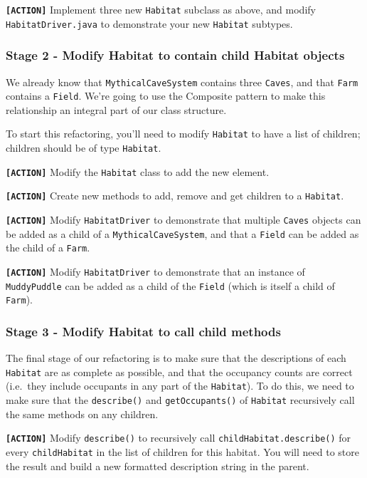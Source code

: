 \documentclass[
]{book}
\begin{document}
\textbf{\texttt{{[}ACTION{]}}} Implement three new \texttt{Habitat} subclass as above, and modify \texttt{HabitatDriver.java} to demonstrate your new \texttt{Habitat} subtypes.

\hypertarget{children}{%
\subsubsection{Stage 2 - Modify Habitat to contain child Habitat objects}\label{children}}

We already know that \texttt{MythicalCaveSystem} contains three \texttt{Caves}, and that \texttt{Farm} contains a \texttt{Field}. We're going to use the Composite pattern to make this relationship an integral part of our class structure.

To start this refactoring, you'll need to modify \texttt{Habitat} to have a list of children; children should be of type \texttt{Habitat}.

\textbf{\texttt{{[}ACTION{]}}} Modify the \texttt{Habitat} class to add the new element.

\textbf{\texttt{{[}ACTION{]}}} Create new methods to add, remove and get children to a \texttt{Habitat}.

\textbf{\texttt{{[}ACTION{]}}} Modify \texttt{HabitatDriver} to demonstrate that multiple \texttt{Caves} objects can be added as a child of a \texttt{MythicalCaveSystem}, and that a \texttt{Field} can be added as the child of a \texttt{Farm}.

\textbf{\texttt{{[}ACTION{]}}} Modify \texttt{HabitatDriver} to demonstrate that an instance of \texttt{MuddyPuddle} can be added as a child of the \texttt{Field} (which is itself a child of \texttt{Farm}).

\hypertarget{childmethods}{%
\subsubsection{Stage 3 - Modify Habitat to call child methods}\label{childmethods}}

The final stage of our refactoring is to make sure that the descriptions of each \texttt{Habitat} are as complete as possible, and that the occupancy counts are correct (i.e.~they include occupants in any part of the \texttt{Habitat}). To do this, we need to make sure that the \texttt{describe()} and \texttt{getOccupants()} of \texttt{Habitat} recursively call the same methods on any children.

\textbf{\texttt{{[}ACTION{]}}} Modify \texttt{describe()} to recursively call \texttt{childHabitat.describe()} for every \texttt{childHabitat} in the list of children for this habitat. You will need to store the result and build a new formatted description string in the parent.
\end{document}
